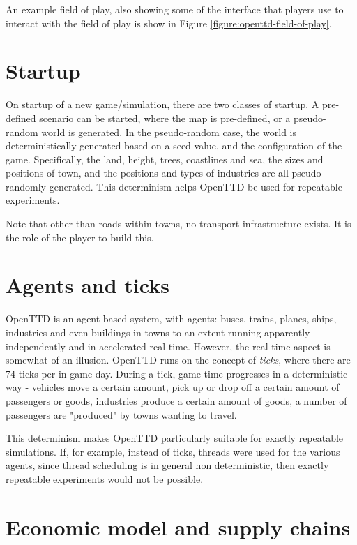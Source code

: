 \documentclass[logo,msc,dsti]{infthesis}    %
\begin{document}
{An example field of play, also showing some of the interface that players use to interact with the field of play is show in Figure \ref{figure:openttd-field-of-play}.

\section{Startup}

On startup of a new game/simulation, there are two classes of startup. A pre-defined scenario can be started, where the map is pre-defined, or a pseudo-random world is generated. In the pseudo-random case, the world is deterministically generated based on a seed value, and the configuration of the game. Specifically, the land, height, trees, coastlines and sea, the sizes and positions of town, and the positions and types of industries are all pseudo-randomly generated. This determinism helps OpenTTD be used for repeatable experiments.

Note that other than roads within towns, no transport infrastructure exists. It is the role of the player to build this.

\section{Agents and ticks}

OpenTTD is an agent-based system, with agents: buses, trains, planes, ships, industries and even buildings in towns to an extent running apparently independently and in accelerated real time. However, the real-time aspect is somewhat of an illusion. OpenTTD runs on the concept of \emph{ticks}, where there are 74 ticks per in-game day. During a tick, game time progresses in a deterministic way - vehicles move a certain amount, pick up or drop off a certain amount of passengers or goods, industries produce a certain amount of goods, a number of passengers are "produced" by towns wanting to travel.

This determinism makes OpenTTD particularly suitable for exactly repeatable simulations. If, for example, instead of ticks, threads were used for the various agents, since thread scheduling is in general non deterministic, then exactly repeatable experiments would not be possible.

\section{Economic model and supply chains}

}
\end{document}
